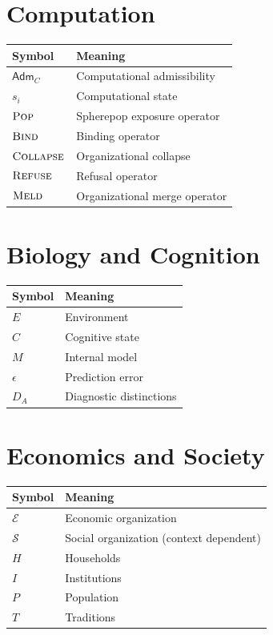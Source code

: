 \documentclass[11pt,oneside]{book}
\numberwithin{equation}{chapter}
\theoremstyle{definition}
\theoremstyle{plain}
\newcommand{\Adm}{\mathsf{Adm}}
\begin{document}
\section{Computation}

\begin{longtable}{ll}
\toprule
Symbol & Meaning\\
\midrule
$\Adm_C$ & Computational admissibility\\
$s_i$ & Computational state\\
$\textsc{Pop}$ & Spherepop exposure operator\\
$\textsc{Bind}$ & Binding operator\\
$\textsc{Collapse}$ & Organizational collapse\\
$\textsc{Refuse}$ & Refusal operator\\
$\textsc{Meld}$ & Organizational merge operator\\
\bottomrule
\end{longtable}

\section{Biology and Cognition}

\begin{longtable}{ll}
\toprule
Symbol & Meaning\\
\midrule
$E$ & Environment\\
$C$ & Cognitive state\\
$M$ & Internal model\\
$\epsilon$ & Prediction error\\
$D_A$ & Diagnostic distinctions\\
\bottomrule
\end{longtable}

\section{Economics and Society}

\begin{longtable}{ll}
\toprule
Symbol & Meaning\\
\midrule
$\mathcal E$ & Economic organization\\
$\mathcal S$ & Social organization (context dependent)\\
$H$ & Households\\
$I$ & Institutions\\
$P$ & Population\\
$T$ & Traditions\\
\bottomrule
\end{longtable}
\end{document}
